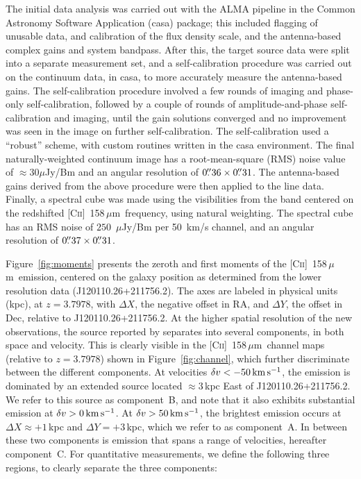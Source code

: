 \documentclass[twocolumn]{aastex62}
\newcommand{\origpos}{J120110.26+211756.2}
\newcommand{\cplus}{[\ctwo]~158\,$\mu$m}
\newcommand{\mkms}{\rm km \, s^{-1}}
\newcommand{\ctwo}{C\textsc{ii}}
\begin{document}
The initial data analysis was carried out with the ALMA pipeline in the Common Astronomy Software Application ({\sc casa}) package; this included flagging of unusable data, and calibration of the flux density scale, and the antenna-based complex gains and system bandpass. After this, the target source data were split into a separate measurement set, and a self-calibration procedure was carried out on the continuum data, in {\sc casa}, to more accurately measure the antenna-based gains. The self-calibration procedure involved a few rounds of imaging and phase-only self-calibration, followed by a couple of rounds of amplitude-and-phase self-calibration and imaging, until the gain solutions converged and no improvement was seen in the image on further 
self-calibration. The self-calibration used a ``robust'' scheme, with custom 
routines written in the {\sc casa} environment. The final naturally-weighted continuum 
image has a root-mean-square (RMS) noise value of $\approx 30 \mu$Jy/Bm and an angular 
resolution of $0\mbox{$.\!\!^{\prime\prime}$}36 \times 0\mbox{$.\!\!^{\prime\prime}$}31$. The antenna-based gains derived from the above 
procedure were then applied to the line data. Finally, a spectral cube was made using the 
visibilities from the band centered on the redshifted \cplus\ frequency, using natural 
weighting. The spectral cube has an RMS noise of $250$~$\mu$Jy/Bm per 50~km/s channel, 
and an angular resolution of $0\mbox{$.\!\!^{\prime\prime}$}37 \times 0\mbox{$.\!\!^{\prime\prime}$}31$.

Figure~\ref{fig:moments} presents the zeroth and first moments of the \cplus\ emission, 
centered on the galaxy position as determined from the lower resolution data (\origpos). The axes are labeled in physical units (kpc), at $z=3.7978$, with 
$\Delta X$, the negative offset in RA, and $\Delta Y$, the offset in Dec, relative to 
\origpos. At the higher spatial resolution of the new observations, the source reported 
by \citet{neeleman+17} separates into several components, in both space and velocity. 
This is clearly visible in the \cplus\ channel maps (relative to $z=3.7978$) shown in 
Figure~\ref{fig:channel}, which further discriminate between the different components. 
At velocities $\delta v < -50 \, \mkms$, the emission is 
dominated by an extended source located $\approx 3$\,kpc East of \origpos. We refer to 
this source as component~B, and note that it also exhibits substantial emission at $\delta v > 0 \, \mkms$.
At $\delta v > 50 \, \mkms$, the brightest emission occurs 
at $\Delta X \approx +1$\,kpc and $\Delta Y = +3$\,kpc, which we refer to as component~A. 
In between these two components is emission that spans a range of velocities, hereafter 
component~C. For quantitative measurements, we define the following three regions, to 
clearly separate the three components:
\end{document}
